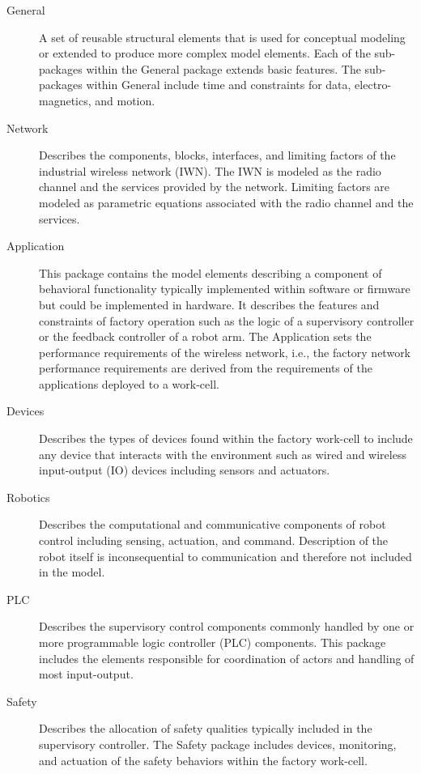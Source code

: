 \begin{description}

\item[General] A set of reusable structural elements that is used for conceptual modeling or extended to produce more complex model elements.  Each of the sub-packages within the General package extends basic features.  The sub-packages within General include time and constraints for data, electro-magnetics, and motion.

\item[Network] Describes the components, blocks, interfaces, and limiting factors of the industrial wireless network (IWN).  The IWN is modeled as the radio channel and the services provided by the network. Limiting factors are modeled as parametric equations associated with the radio channel and the services.

\item[Application]  This package contains the model elements describing a component of behavioral functionality typically implemented within software or firmware but could be implemented in hardware.  It describes the features and constraints of factory operation such as the logic of a supervisory controller or the feedback controller of a robot arm.  The Application sets the performance requirements of the wireless network, i.e., the factory network performance requirements are derived from the requirements of the applications deployed to a work-cell.

\item[Devices] Describes the types of devices found within the factory work-cell to include any device that interacts with the environment such as wired and wireless input-output (IO) devices including sensors and actuators.

\item[Robotics] Describes the computational and communicative components of robot control including sensing, actuation, and command.  Description of the robot itself is inconsequential to communication and therefore not included in the model.

\item[PLC] Describes the supervisory control components commonly handled by one or more programmable logic controller (PLC) components.  This package includes the elements responsible for coordination of actors and handling of most input-output.

\item[Safety] Describes the allocation of safety qualities typically included in the supervisory controller.  The Safety package includes devices, monitoring, and actuation of the safety behaviors within the factory work-cell.


\end{description}
